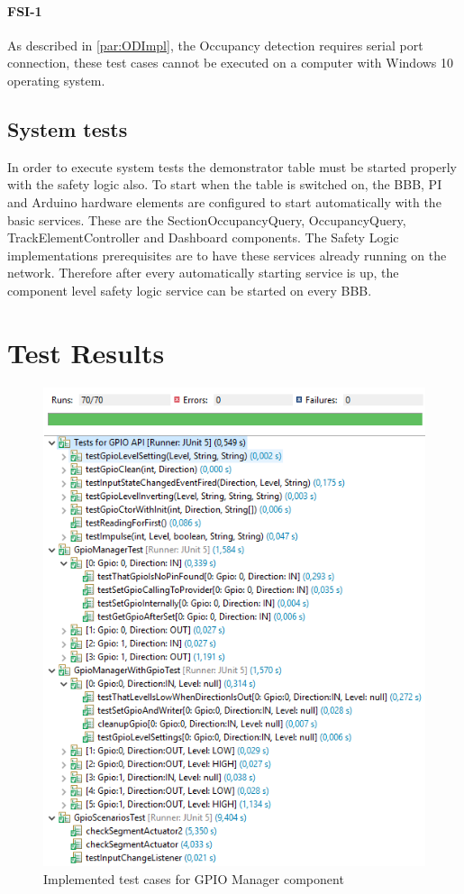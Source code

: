 \paragraph{FSI-1} As described in \autoref{par:ODImpl}, the Occupancy detection requires serial port connection, these test cases cannot be executed on a computer with Windows 10 operating system.

\subsection{System tests}
In order to execute system tests the demonstrator table must be started properly with the safety logic also. To start when the table is switched on, the BBB, PI and Arduino hardware elements are configured to start automatically with the basic services. These are the SectionOccupancyQuery, OccupancyQuery, TrackElementController and Dashboard components. The Safety Logic implementations prerequisites are to have these services already running on the network. Therefore after every automatically starting service is up, the component level safety logic service can be started on every BBB.

\section{Test Results}
\begin{figure}[ht]
	\centering
	\includegraphics[width=120mm, keepaspectratio]{figures/impl/gpioTests.png}
	\caption{Implemented test cases for GPIO Manager component}
	\label{fig:gpiomanagerTests}
\end{figure}

